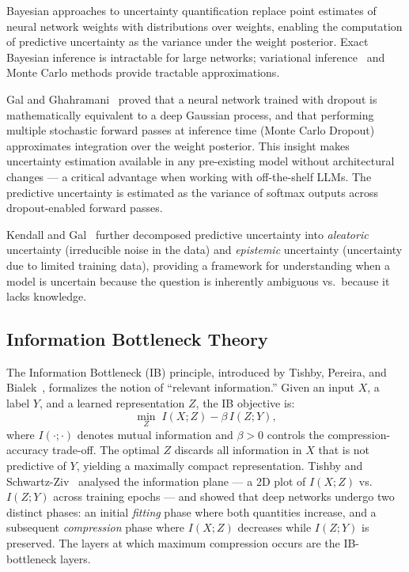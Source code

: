 \documentclass[conference]{IEEEtran}
\begin{document}
Bayesian approaches to uncertainty quantification replace point
estimates of neural network weights with distributions over weights,
enabling the computation of predictive uncertainty as the variance
under the weight posterior. Exact Bayesian inference is intractable
for large networks; variational inference~\cite{graves2011practical}
and Monte Carlo methods provide tractable approximations.

Gal and Ghahramani~\cite{gal2016dropout} proved that a neural network
trained with dropout is mathematically equivalent to a deep Gaussian
process, and that performing multiple stochastic forward passes at
inference time (Monte Carlo Dropout) approximates integration over the
weight posterior. This insight makes uncertainty estimation available
in any pre-existing model without architectural changes --- a critical
advantage when working with off-the-shelf LLMs. The predictive
uncertainty is estimated as the variance of softmax outputs across
dropout-enabled forward passes.

Kendall and Gal~\cite{kendall2017uncertainties} further decomposed
predictive uncertainty into \emph{aleatoric} uncertainty (irreducible
noise in the data) and \emph{epistemic} uncertainty (uncertainty due
to limited training data), providing a framework for understanding
when a model is uncertain because the question is inherently ambiguous
vs.\ because it lacks knowledge.

\subsection{Information Bottleneck Theory}

The Information Bottleneck (IB) principle, introduced by Tishby,
Pereira, and Bialek~\cite{tishby2000information}, formalizes the
notion of ``relevant information.'' Given an input $X$, a label $Y$,
and a learned representation $Z$, the IB objective is:
\begin{equation}
    \min_{Z}\; I(X;Z) - \beta\,I(Z;Y),
    \label{eq:ib}
\end{equation}
where $I(\cdot;\cdot)$ denotes mutual information and $\beta>0$
controls the compression-accuracy trade-off. The optimal $Z$ discards
all information in $X$ that is not predictive of $Y$, yielding a
maximally compact representation. Tishby and Schwartz-Ziv~\cite{tishby2015deep}
analysed the information plane --- a 2D plot of $I(X;Z)$ vs.\ $I(Z;Y)$
across training epochs --- and showed that deep networks undergo two
distinct phases: an initial \emph{fitting} phase where both quantities
increase, and a subsequent \emph{compression} phase where $I(X;Z)$
decreases while $I(Z;Y)$ is preserved. The layers at which maximum
compression occurs are the IB-bottleneck layers.
\end{document}
